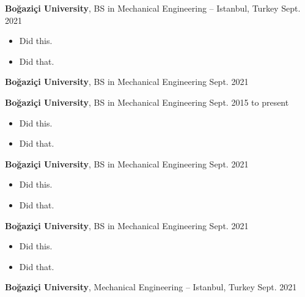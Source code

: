 \documentclass[10pt, letterpaper]{article}
\newenvironment{highlights}{
        \begin{itemize}[
                topsep=0pt,
                partopsep=0pt,
                itemsep=0pt,
                leftmargin=10pt
            ]
    }{
        \end{itemize}
    } %
\begin{document}
        \textbf{Boğaziçi University}, BS in Mechanical Engineering -- Istanbul, Turkey \hfill Sept. 2021

        \begin{highlights}
        \item Did this.
        \item Did that.
        \end{highlights}


        \vspace{8pt}

        \textbf{Boğaziçi University}, BS in Mechanical Engineering \hfill Sept. 2021



        \vspace{8pt}

        \textbf{Boğaziçi University}, BS in Mechanical Engineering \hfill Sept. 2015 to present

        \begin{highlights}
        \item Did this.
        \item Did that.
        \end{highlights}


        \vspace{8pt}

        \textbf{Boğaziçi University}, BS in Mechanical Engineering \hfill Sept. 2021

        \begin{highlights}
        \item Did this.
        \item Did that.
        \end{highlights}


        \vspace{8pt}

        \textbf{Boğaziçi University}, BS in Mechanical Engineering \hfill Sept. 2021

        \begin{highlights}
        \item Did this.
        \item Did that.
        \end{highlights}


        \vspace{8pt}

        \textbf{Boğaziçi University}, Mechanical Engineering -- Istanbul, Turkey \hfill Sept. 2021
\end{document}
